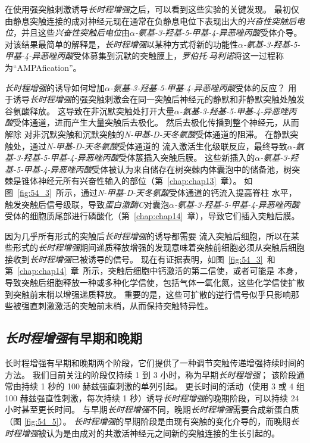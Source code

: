 在使用强突触刺激诱导\textit{长时程增强}之后，可以看到这些实验的关键发现。
最初仅由静息突触连接的成对神经元现在通常在负静息电位下表现出大的\textit{兴奋性突触后电位}，并且这些\textit{兴奋性突触后电位}由\textit{$\alpha$-氨基-3-羟基-5-甲基-4-异恶唑丙酸}受体介导。
对该结果最简单的解释是，\textit{长时程增强}以某种方式将新的功能性\textit{$\alpha$-氨基-3-羟基-5-甲基-4-异恶唑丙酸}受体募集到沉默的突触膜上，\textit{罗伯托$\cdot$马利诺}将这一过程称为“AMPAfication”。


\textit{长时程增强}的诱导如何增加\textit{$\alpha$-氨基-3-羟基-5-甲基-4-异恶唑丙酸}受体的反应？
用于诱导\textit{长时程增强}的强突触刺激会在同一突触后神经元的静默和非静默突触处触发谷氨酸释放。
这导致在非沉默突触处打开大量\textit{$\alpha$-氨基-3-羟基-5-甲基-4-异恶唑丙酸}受体通道，进而产生大量突触后去极化。
然后去极化传播到整个神经元，从而解除  对非沉默突触和沉默突触的\textit{N-甲基-D-天冬氨酸}受体通道的阻滞。
在静默突触处，通过\textit{N-甲基-D-天冬氨酸}受体通道的  流入激活生化级联反应，最终导致\textit{$\alpha$-氨基-3-羟基-5-甲基-4-异恶唑丙酸}受体簇插入突触后膜。
这些新插入的\textit{$\alpha$-氨基-3-羟基-5-甲基-4-异恶唑丙酸}受体被认为来自储存在树突棘内体囊泡中的储备池，树突棘是锥体神经元所有兴奋性输入的部位（第~\ref{chap:chap13}~章）。
如图~\ref{fig:54_3}~所示，通过\textit{N-甲基-D-天冬氨酸}受体通道的钙流入提高脊柱  水平，触发突触后信号级联，导致\textit{蛋白激酶C}对囊泡\textit{$\alpha$-氨基-3-羟基-5-甲基-4-异恶唑丙酸}受体的细胞质尾部进行磷酸化（第~\ref{chap:chap14}~章），导致它们插入突触后膜。


因为几乎所有形式的突触后\textit{长时程增强}的诱导都需要  流入突触后细胞，所以在某些形式的\textit{长时程增强}期间递质释放增强的发现意味着突触前细胞必须从突触后细胞接收到\textit{长时程增强}已被诱导的信号。
现在有证据表明，如图~\ref{fig:54_3}~和第~\ref{chap:chap14}~章~所示，突触后细胞中钙激活的第二信使，或者可能是  本身，导致突触后细胞释放一种或多种化学信使，包括气体一氧化氮，这些化学信使扩散到突触前末梢以增强递质释放。
重要的是，这些可扩散的逆行信号似乎只影响那些被强直刺激激活的突触前末梢，从而保持突触特异性。



\subsection{\textit{长时程增强}有早期和晚期}

长时程增强有早期和晚期两个阶段，它们提供了一种调节突触传递增强持续时间的方法。
我们目前关注的阶段仅持续 1 到 3 小时，称为早期\textit{长时程增强}；
该阶段通常由持续 1 秒的 100 赫兹强直刺激的单列引起。
更长时间的活动（使用 3 或 4 组 100 赫兹强直性刺激，每次持续 1 秒）诱导\textit{长时程增强}的晚期阶段，可以持续 24 小时甚至更长时间。
与早期\textit{长时程增强}不同，晚期\textit{长时程增强}需要合成新蛋白质（图 \ref{fig:54_5}）。
\textit{长时程增强}的早期阶段是由现有突触的变化介导的，而晚期\textit{长时程增强}被认为是由成对的共激活神经元之间新的突触连接的生长引起的。


